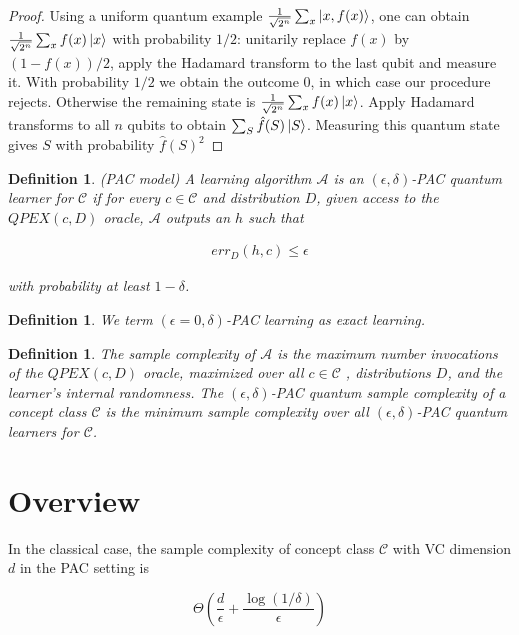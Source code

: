 \documentclass[12]{amsart}
\newcommand\0{\mathbf{0}}
\newcommand\<{\langle}
\renewcommand\>{\rangle}
\newtheorem{definition}[theorem]{Definition}
\begin{document}
\begin{proof} 
Using a uniform quantum example $\frac{1}{\sqrt{2^n}}\sum_x \ket{x, f(x)}$, one can obtain $\frac{1}{\sqrt{2^n}}\sum_x f(x)\ket{x}$ with
probability $1/2$: unitarily replace $f (x)$ by $(1 − f (x))/2$, apply the Hadamard transform to the last qubit and measure it. With probability $1/2$ we obtain the outcome 0, in which case our procedure rejects. Otherwise the remaining state is $\frac{1}{\sqrt{2^n}}\sum_x f(x)\ket{x}$. Apply Hadamard transforms to all $n$ qubits to obtain $\sum_S \hat{f}(S)\ket{S}$. Measuring this quantum state gives $S$ with probability $\hat{f}(S)^2$
\end{proof}

\begin{definition}
(PAC model) A learning algorithm $\mathcal{A}$ is an $(\epsilon, \delta)$-PAC quantum learner for $\mathcal{C}$ if for every $c \in \mathcal{C}$ and distribution $D$, given access to the $QPEX(c,D)$ oracle, $\mathcal{A}$ outputs an $h$ such that 

\begin{align}
err_D (h, c) \leq \epsilon	
\end{align}

with probability at least $1 - \delta$.
\end{definition}

\begin{definition}
We term $(\epsilon=0, \delta)$-PAC learning as exact learning.	
\end{definition}


\begin{definition}
The sample complexity of $\mathcal{A}$ is the maximum number invocations of the $QPEX(c,D)$ oracle, maximized over all $c \in \mathcal{C}$ , distributions $D$, and the learner’s internal randomness. The $(\epsilon, \delta)$-PAC quantum sample complexity of a concept class $\mathcal{C}$ is the minimum sample complexity over all $(\epsilon,\delta)$-PAC quantum learners for $\mathcal{C}$.
\end{definition}

\section{Overview}

In the classical case, the sample complexity of concept class $\mathcal{C}$ with VC dimension $d$ in the PAC setting is

$$
\Theta(\frac{d}{\epsilon} + \frac{\log(1/\delta)}{\epsilon})
$$
\end{document}
